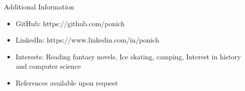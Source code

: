 \documentclass[]{mcdowellcv}
\begin{document}
\begin{cvsection}{Additional Information}
    \begin{cvsubsection}{}{}{}
        \begin{itemize}
            \item GitHub: https://github.com/ponich
            \item LinkedIn: https://www.linkedin.com/in/ponich
            \item Interests: Reading fantasy novels, Ice skating, camping, Interest in history and computer science
            \item References available upon request
        \end{itemize}
    \end{cvsubsection}
\end{cvsection}
\end{document}
